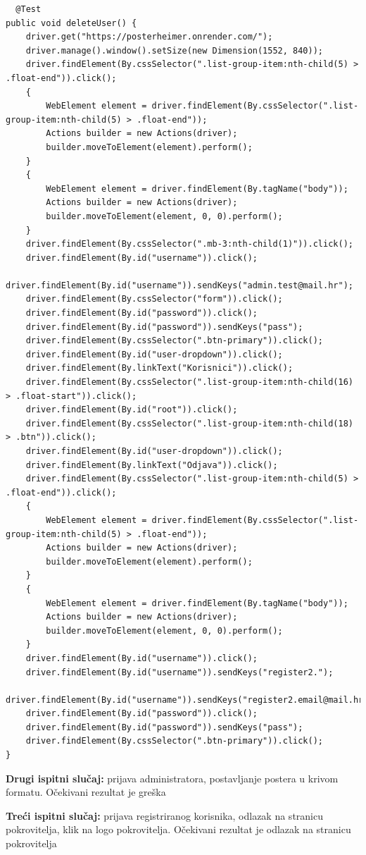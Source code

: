 		\begin{lstlisting}
  @Test
public void deleteUser() {
	driver.get("https://posterheimer.onrender.com/");
	driver.manage().window().setSize(new Dimension(1552, 840));
	driver.findElement(By.cssSelector(".list-group-item:nth-child(5) > .float-end")).click();
	{
		WebElement element = driver.findElement(By.cssSelector(".list-group-item:nth-child(5) > .float-end"));
		Actions builder = new Actions(driver);
		builder.moveToElement(element).perform();
	}
	{
		WebElement element = driver.findElement(By.tagName("body"));
		Actions builder = new Actions(driver);
		builder.moveToElement(element, 0, 0).perform();
	}
	driver.findElement(By.cssSelector(".mb-3:nth-child(1)")).click();
	driver.findElement(By.id("username")).click();
	driver.findElement(By.id("username")).sendKeys("admin.test@mail.hr");
	driver.findElement(By.cssSelector("form")).click();
	driver.findElement(By.id("password")).click();
	driver.findElement(By.id("password")).sendKeys("pass");
	driver.findElement(By.cssSelector(".btn-primary")).click();
	driver.findElement(By.id("user-dropdown")).click();
	driver.findElement(By.linkText("Korisnici")).click();
	driver.findElement(By.cssSelector(".list-group-item:nth-child(16) > .float-start")).click();
	driver.findElement(By.id("root")).click();
	driver.findElement(By.cssSelector(".list-group-item:nth-child(18) > .btn")).click();
	driver.findElement(By.id("user-dropdown")).click();
	driver.findElement(By.linkText("Odjava")).click();
	driver.findElement(By.cssSelector(".list-group-item:nth-child(5) > .float-end")).click();
	{
		WebElement element = driver.findElement(By.cssSelector(".list-group-item:nth-child(5) > .float-end"));
		Actions builder = new Actions(driver);
		builder.moveToElement(element).perform();
	}
	{
		WebElement element = driver.findElement(By.tagName("body"));
		Actions builder = new Actions(driver);
		builder.moveToElement(element, 0, 0).perform();
	}
	driver.findElement(By.id("username")).click();
	driver.findElement(By.id("username")).sendKeys("register2.");
	driver.findElement(By.id("username")).sendKeys("register2.email@mail.hr");
	driver.findElement(By.id("password")).click();
	driver.findElement(By.id("password")).sendKeys("pass");
	driver.findElement(By.cssSelector(".btn-primary")).click();
}
		\end{lstlisting}
		 	
		 	
		 	\textbf{Drugi ispitni slučaj:} prijava administratora, postavljanje postera u krivom formatu. Očekivani rezultat je greška
		 	
		 	\textbf{Treći ispitni slučaj:} prijava registriranog korisnika, odlazak na stranicu pokrovitelja, klik na logo pokrovitelja. Očekivani rezultat je odlazak na stranicu pokrovitelja
		 	
